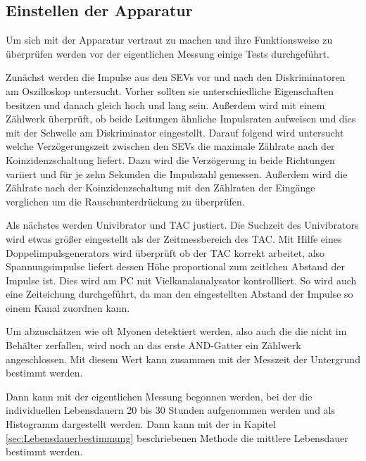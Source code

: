 \subsection{Einstellen der Apparatur}
Um sich mit der Apparatur vertraut zu machen und ihre Funktionsweise zu überprüfen werden vor der eigentlichen Messung einige Tests durchgeführt.

Zunächst werden die Impulse aus den SEVs vor und nach den Diskriminatoren am Oszilloskop untersucht. Vorher sollten sie unterschiedliche Eigenschaften besitzen und danach gleich hoch und lang sein. Außerdem wird mit einem Zählwerk überprüft, ob beide Leitungen ähnliche Impulsraten aufweisen und dies mit der Schwelle am Diskriminator eingestellt. Darauf folgend wird untersucht welche Verzögerungszeit zwischen den SEVs die maximale Zählrate nach der Koinzidenzschaltung liefert. Dazu wird die Verzögerung in beide Richtungen variiert und für je zehn Sekunden die Impulszahl gemessen.
Außerdem wird die Zählrate nach der Koinzidenzschaltung mit den Zählraten der Eingänge verglichen um die Rauschunterdrückung zu überprüfen.

Als nächstes werden Univibrator und TAC justiert. Die Suchzeit des Univibrators wird etwas größer eingestellt als der Zeitmessbereich des TAC. Mit Hilfe eines Doppelimpulsgenerators wird überprüft ob der TAC korrekt arbeitet, also Spannungsimpulse liefert dessen Höhe proportional zum zeitlchen Abstand der Impulse ist. Dies wird am PC mit Vielkanalanalysator kontrollliert. So wird auch eine Zeiteichung durchgeführt, da man den eingestellten Abstand der Impulse so einem Kanal zuordnen kann.

Um abzuschätzen wie oft Myonen detektiert werden, also auch die die nicht im Behälter zerfallen, wird noch an das erste AND-Gatter ein Zählwerk angeschlossen. Mit diesem Wert kann zusammen mit der Messzeit der Untergrund bestimmt werden.

Dann kann mit der eigentlichen Messung begonnen werden, bei der die individuellen Lebensdauern \num{20} bis \num{30} Stunden aufgenommen werden und als Histogramm dargestellt werden. Dann kann mit der in Kapitel \ref{sec:Lebensdauerbestimmung} beschriebenen Methode die mittlere Lebensdauer bestimmt werden.
